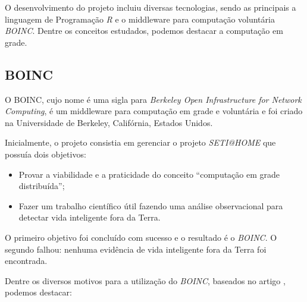 O desenvolvimento do projeto incluiu diversas tecnologias, sendo as principais a linguagem de Programação \emph{R} e o middleware
para computação voluntária \emph{BOINC}. Dentre os conceitos estudados, podemos destacar a computação em grade.  

\subsection{BOINC}

O BOINC, cujo nome é uma sigla para \textit{Berkeley Open Infrastructure for Network Computing}, é um middleware 
para computação em grade e voluntária e foi criado na Universidade de Berkeley, Califórnia, Estados Unidos.

Inicialmente, o projeto consistia em gerenciar o projeto \textit{SETI@HOME} que possuía dois objetivos:

\begin{itemize}
	\item Provar a viabilidade e a praticidade do conceito ``computação em grade distribuída'';
	\item Fazer um trabalho científico útil fazendo uma análise observacional para detectar vida inteligente fora da Terra.
\end{itemize}

O primeiro objetivo foi concluído com sucesso e o resultado é o \textit{BOINC}. O segundo falhou: nenhuma evidência de 
vida inteligente fora da Terra foi encontrada. 

Dentre os diversos motivos para a utilização do \emph{BOINC}, baseados no artigo \cite{boinc}, podemos destacar:

